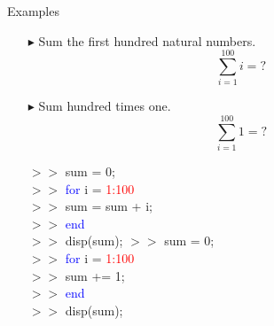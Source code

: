 \documentclass[xcolor={dvipsnames,rgb}, aspectratio=169]{beamer}
\begin{document}
\begin{frame}{Examples}
    \begin{itemize}
        \item[$\blacktriangleright$] Sum the first hundred natural numbers.
              \begin{equation*}
                  \sum_{i = 1}^{100} i = ?
              \end{equation*}
        \item[$\blacktriangleright$] Sum hundred times one.
              \begin{equation*}
                  \sum_{i=1}^{100} 1 = ?
              \end{equation*}
              \begin{tcolorbox}[colback=white,colframe=bluepoli,sidebyside]
                  $>>$ sum = 0; \\
                  $>>$ \textcolor{blue}{for} i = \textcolor{red}{1:100}\\
                  $>>$ \hspace{1em}sum = sum + i;\\
                  $>>$ \textcolor{blue}{end}\\
                  $>>$ disp(sum);
                  \tcblower
                  $>>$ sum = 0; \\
                  $>>$ \textcolor{blue}{for} i = \textcolor{red}{1:100}\\
                  $>>$ \hspace{1em}sum += 1;\\
                  $>>$ \textcolor{blue}{end}\\
                  $>>$ disp(sum);
              \end{tcolorbox}
    \end{itemize}
\end{frame}
\end{document}
